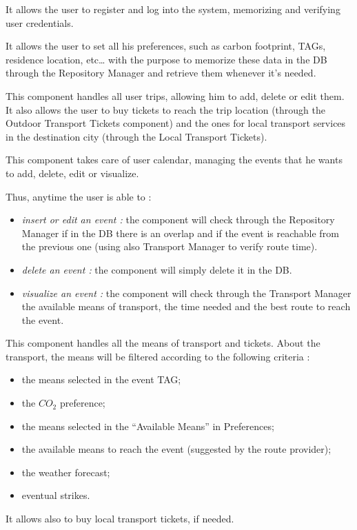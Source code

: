 It allows the user to register and log into the system, memorizing and verifying user credentials.

It allows the user to set all his preferences, such as carbon footprint, TAGs, residence location, etc… with the purpose to memorize these data in the DB through the Repository Manager and retrieve them whenever it's needed.

This component handles all user trips, allowing him to add, delete or edit them. It also allows the user to buy tickets to reach the trip location (through the Outdoor Transport Tickets component) and the ones for local transport services in the destination city (through the Local Transport Tickets).

\newpage
{}
This component takes care of user calendar, managing the events that he wants to add, delete, edit or visualize.\par
Thus, anytime the user is able to :
\begin{itemize}
	\setlength{\leftskip}{1cm}
	\item \emph{insert or edit an event :} the component will check through the Repository Manager if in the DB there is an overlap and if the event is reachable from the previous one (using also Transport Manager to verify route time).
	\item \emph{delete an event :} the component will simply delete it in the DB.
	\item \emph{visualize an event :} the component will check through the Transport Manager the available means of transport, the time needed and the best route to reach the event.
\end{itemize}

This component handles all the means of transport and tickets. About the transport, the means will be filtered according to the following criteria :
\begin{itemize}
	\setlength{\leftskip}{1cm}
	\item the means selected in the event TAG;
	\item the $CO_2$ preference;
	\item the means selected in the “Available Means” in Preferences;
	\item the available means to reach the event (suggested by the route provider);
	\item the weather forecast;
	\item eventual strikes.
\end{itemize}
It allows also to buy local transport tickets, if needed. 

